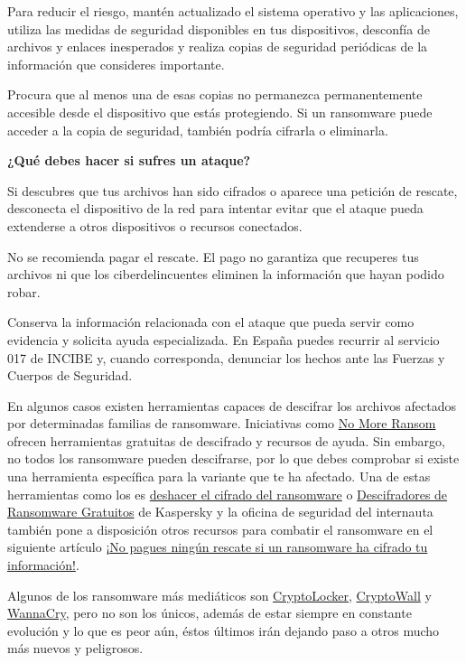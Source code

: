 \documentclass[
  spanish,
  a4paper,
  openany]{book}
\begin{document}
Para reducir el riesgo, mantén actualizado el sistema operativo y las aplicaciones, utiliza las medidas de seguridad disponibles en tus dispositivos, desconfía de archivos y enlaces inesperados y realiza copias de seguridad periódicas de la información que consideres importante.

Procura que al menos una de esas copias no permanezca permanentemente accesible desde el dispositivo que estás protegiendo. Si un ransomware puede acceder a la copia de seguridad, también podría cifrarla o eliminarla.

\textbf{¿Qué debes hacer si sufres un ataque?}

Si descubres que tus archivos han sido cifrados o aparece una petición de rescate, desconecta el dispositivo de la red para intentar evitar que el ataque pueda extenderse a otros dispositivos o recursos conectados.

No se recomienda pagar el rescate. El pago no garantiza que recuperes tus archivos ni que los ciberdelincuentes eliminen la información que hayan podido robar.

Conserva la información relacionada con el ataque que pueda servir como evidencia y solicita ayuda especializada. En España puedes recurrir al servicio 017 de INCIBE y, cuando corresponda, denunciar los hechos ante las Fuerzas y Cuerpos de Seguridad.

En algunos casos existen herramientas capaces de descifrar los archivos afectados por determinadas familias de ransomware. Iniciativas como \href{https://www.nomoreransom.org/}{No More Ransom} ofrecen herramientas gratuitas de descifrado y recursos de ayuda. Sin embargo, no todos los ransomware pueden descifrarse, por lo que debes comprobar si existe una herramienta específica para la variante que te ha afectado. Una de estas herramientas como los es \href{https://www.avg.com/es-es/ransomware-decryption-tools}{deshacer el cifrado del ransomware} o \href{https://noransom.kaspersky.com/es/}{Descifradores de Ransomware Gratuitos} de Kaspersky y la oficina de seguridad del internauta también pone a disposición otros recursos para combatir el ransomware en el siguiente artículo \href{https://www.osi.es/es/actualidad/blog/2022/11/17/no-pagues-ningun-rescate-si-un-ransomware-ha-cifrado-tu-informacion}{¡No pagues ningún rescate si un ransomware ha cifrado tu información!}.

Algunos de los ransomware más mediáticos son \href{https://es.wikipedia.org/wiki/CryptoLocker}{CryptoLocker}, \href{https://es.wikipedia.org/wiki/Ransomware\#CryptoWall}{CryptoWall} y \href{https://es.wikipedia.org/wiki/WannaCry}{WannaCry}, pero no son los únicos, además de estar siempre en constante evolución y lo que es peor aún, éstos últimos irán dejando paso a otros mucho más nuevos y peligrosos.
\end{document}
